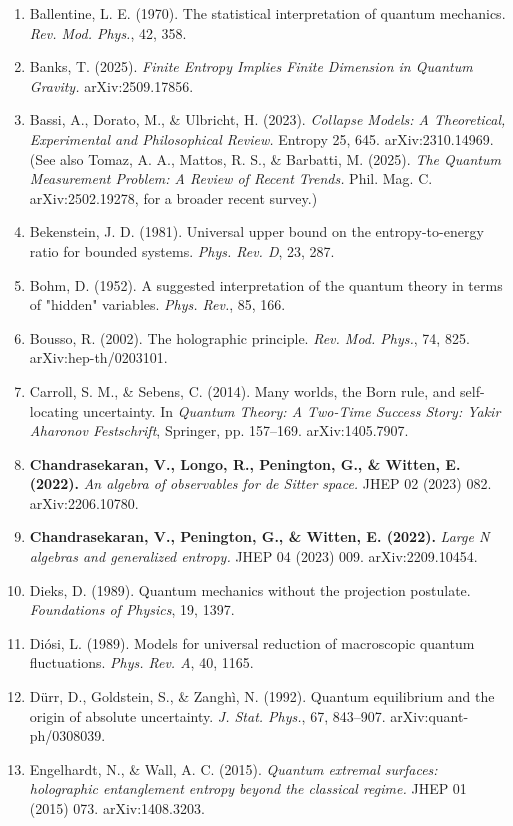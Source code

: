 \documentclass[11pt,a4paper]{article}
\begin{document}
\begin{enumerate}
  \item Ballentine, L. E. (1970). The statistical interpretation of quantum mechanics. \emph{Rev. Mod. Phys.}, 42, 358.
  \item Banks, T. (2025). \emph{Finite Entropy Implies Finite Dimension in Quantum Gravity.} arXiv:2509.17856.
  \item Bassi, A., Dorato, M., \& Ulbricht, H. (2023). \emph{Collapse Models: A Theoretical, Experimental and Philosophical Review.} Entropy 25, 645. arXiv:2310.14969. (See also Tomaz, A. A., Mattos, R. S., \& Barbatti, M. (2025). \emph{The Quantum Measurement Problem: A Review of Recent Trends.} Phil. Mag. C. arXiv:2502.19278, for a broader recent survey.)
  \item Bekenstein, J. D. (1981). Universal upper bound on the entropy-to-energy ratio for bounded systems. \emph{Phys. Rev. D}, 23, 287.
  \item Bohm, D. (1952). A suggested interpretation of the quantum theory in terms of "hidden" variables. \emph{Phys. Rev.}, 85, 166.
  \item Bousso, R. (2002). The holographic principle. \emph{Rev. Mod. Phys.}, 74, 825. arXiv:hep-th/0203101.
  \item Carroll, S. M., \& Sebens, C. (2014). Many worlds, the Born rule, and self-locating uncertainty. In \emph{Quantum Theory: A Two-Time Success Story: Yakir Aharonov Festschrift}, Springer, pp. 157–169. arXiv:1405.7907.
  \item \textbf{Chandrasekaran, V., Longo, R., Penington, G., \& Witten, E. (2022).} \emph{An algebra of observables for de Sitter space.} JHEP 02 (2023) 082. arXiv:2206.10780.
  \item \textbf{Chandrasekaran, V., Penington, G., \& Witten, E. (2022).} \emph{Large N algebras and generalized entropy.} JHEP 04 (2023) 009. arXiv:2209.10454.
  \item Dieks, D. (1989). Quantum mechanics without the projection postulate. \emph{Foundations of Physics}, 19, 1397.
  \item Diósi, L. (1989). Models for universal reduction of macroscopic quantum fluctuations. \emph{Phys. Rev. A}, 40, 1165.
  \item Dürr, D., Goldstein, S., \& Zanghì, N. (1992). Quantum equilibrium and the origin of absolute uncertainty. \emph{J. Stat. Phys.}, 67, 843–907. arXiv:quant-ph/0308039.
  \item Engelhardt, N., \& Wall, A. C. (2015). \emph{Quantum extremal surfaces: holographic entanglement entropy beyond the classical regime.} JHEP 01 (2015) 073. arXiv:1408.3203.

\end{enumerate}
\end{document}
